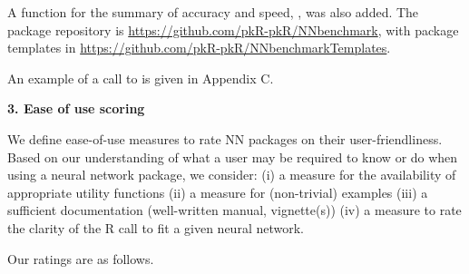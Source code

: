 A function for the summary of accuracy and speed, , was
also added. The package repository is
\url{https://github.com/pkR-pkR/NNbenchmark}, with package templates in
\url{https://github.com/pkR-pkR/NNbenchmarkTemplates}.

An example of a call to  is given in Appendix
C.

\textbf{3. Ease of use scoring}

We define ease-of-use measures to rate NN packages on their
user-friendliness. Based on our understanding of what a user may be
required to know or do when using a neural network package, we consider:
(i) a measure for the availability of appropriate utility functions (ii)
a measure for (non-trivial) examples (iii) a sufficient documentation
(well-written manual, vignette(s)) (iv) a measure to rate the clarity of
the \textsf{R} call to fit a given neural network.

Our ratings are as follows.

